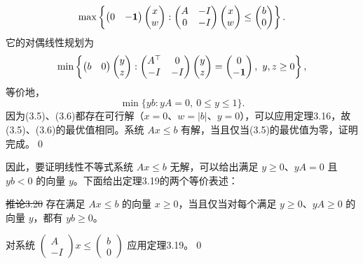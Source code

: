 \[
\max\left\{
\begin{pmatrix}0&-\mathbf1\end{pmatrix}\begin{pmatrix}x\\w\end{pmatrix}:
\begin{pmatrix}A&-I\\0&-I\end{pmatrix}\begin{pmatrix}x\\w\end{pmatrix}
\le\begin{pmatrix}b\\0\end{pmatrix}
\right\}.
\]
它的对偶线性规划为
\[
\min\left\{
\begin{pmatrix}b&0\end{pmatrix}\begin{pmatrix}y\\z\end{pmatrix}:
\begin{pmatrix}A^\top&0\\-I&-I\end{pmatrix}\begin{pmatrix}y\\z\end{pmatrix}
=\begin{pmatrix}0\\-\mathbf1\end{pmatrix},\ y,z\ge0
\right\},
\]
等价地，
\begin{equation}
\min\{yb:yA=0,\ 0\le y\le1\}.\tag{3.6}
\end{equation}
因为(3.5)、(3.6)都存在可行解（$x=0$、$w=|b|$、$y=0$），可以应用定理3.16，故(3.5)、(3.6)的最优值相同。系统 $Ax\le b$ 有解，当且仅当(3.5)的最优值为零，证明完成。\qed

因此，要证明线性不等式系统 $Ax\le b$ 无解，可以给出满足 $y\ge0$、$yA=0$ 且 $yb<0$ 的向量 $y$。下面给出定理3.19的两个等价表述：

\st{推论3.20} 存在满足 $Ax\le b$ 的向量 $x\ge0$，当且仅当对每个满足 $y\ge0$、$yA\ge0$ 的向量 $y$，都有 $yb\ge0$。

\pr 对系统 $\begin{pmatrix}A\\-I\end{pmatrix}x\le\begin{pmatrix}b\\0\end{pmatrix}$ 应用定理3.19。\qed

